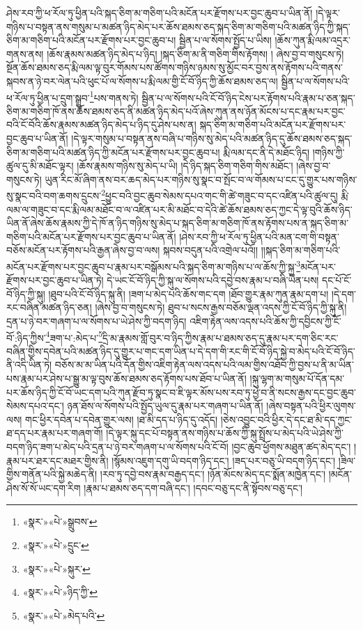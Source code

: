 ཤེས་རབ་ཀྱི་ཕ་རོལ་ཏུ་ཕྱིན་པའི་སྐད་ཅིག་མ་གཅིག་པའི་མངོན་པར་རྫོགས་པར་བྱང་ཆུབ་པ་ཡིན་ནོ། །དེ་ལྟར་གཉིས་པ་བསྟན་ནས་གསུམ་པ་མཚན་ཉིད་མེད་པར་ཆོས་ཐམས་ཅད་སྐད་ཅིག་མ་གཅིག་པའི་མཚན་ཉིད་ཀྱི་སྐད་ཅིག་མ་གཅིག་པའི་མངོན་པར་རྫོགས་པར་བྱང་ཆུབ་པ། སྦྱིན་པ་ལ་སོགས་སྤྱོད་པ་ཡིས། །ཆོས་ཀུན་རྨི་ལམ་འདྲར་གནས་ནས། །ཆོས་རྣམས་མཚན་ཉིད་མེད་པ་ཉིད། །སྐད་ཅིག་མ་ནི་གཅིག་གིས་རྟོགས། །
ཞེས་བྱ་བ་གསུངས་ཏེ། སྔོན་ཆོས་ཐམས་ཅད་རྨི་ལམ་ལྟ་བུར་གོམས་པས་ཚོགས་གཉིས་ཉམས་སུ་མྱོང་བར་བྱས་ནས་རྟོགས་པའི་གནས་སྐབས་ན་ཉེ་བར་ལེན་པའི་ཕུང་པོ་ལ་སོགས་པ་རྨི་ལམ་གྱི་ངོ་བོ་ཉིད་ཀྱི་ཆོས་ཐམས་ཅད་ལ། སྦྱིན་པ་ལ་སོགས་པའི་ཕ་རོལ་ཏུ་ཕྱིན་པ་དྲུག་སྒྲུབ་\footnote{«སྣར་»«པེ་»སྒྲུབས་}པས་གནས་ཏེ། སྦྱིན་པ་ལ་སོགས་པའི་ངོ་བོ་ཉིད་ངེས་པར་རྟོགས་པའི་རྣམ་པ་ཅན་སྐད་ཅིག་མ་གཅིག་ཁོ་ནས་ཆོས་ཐམས་ཅད་ནི་མཚན་ཉིད་མེད་པའོ་ཞེས་ཀུན་ནས་ཉོན་མོངས་པ་དང་རྣམ་པར་བྱང་བའི་ངོ་བོའི་ཆོས་རྣམས་མཚན་ཉིད་མེད་པ་ཉིད་དུ་ཤེས་པས་ན། སྐད་ཅིག་མ་གཅིག་པའི་མངོན་པར་རྫོགས་པར་བྱང་ཆུབ་པ་ཡིན་ནོ། །དེ་ལྟར་གསུམ་པ་བསྟན་ནས་བཞི་པ་གཉིས་སུ་མེད་པའི་མཚན་ཉིད་དུ་ཆོས་ཐམས་ཅད་སྐད་ཅིག་མ་གཅིག་པའི་མཚན་ཉིད་ཀྱི་མངོན་པར་རྫོགས་པར་བྱང་ཆུབ་པ། རྨི་ལམ་དང་ནི་དེ་མཐོང་ཉིད། །གཉིས་ཀྱི་ཚུལ་དུ་མི་མཐོང་ལྟར། །ཆོས་རྣམས་གཉིས་སུ་མེད་པ་ཡི། །དེ་ཉིད་སྐད་ཅིག་གཅིག་གིས་མཐོང་། །ཞེས་བྱ་བ་གསུངས་ཏེ། ཡུན་རིང་མོ་ཞིག་ནས་བར་ཆད་མེད་པར་གཉིས་སུ་སྣང་བ་སྤོང་བ་ལ་གོམས་པ་ངང་དུ་གྱུར་པས་གཉིས་སུ་སྣང་བའི་བག་ཆགས་དྲུངས་\footnote{«སྣར་»«པེ་»དྲུང་}ཕྱུང་བའི་བྱང་ཆུབ་སེམས་དཔའ་གང་གི་ཚེ་གཟུང་བ་དང་འཛིན་པའི་ཚུལ་དུ། རྨི་ལམ་ལ་གཟུང་བ་དང་རྨི་ལམ་མཐོང་བ་ལ་འཛིན་པར་མི་མཐོང་བ་དེའི་ཚེ་ཆོས་ཐམས་ཅད་ཀྱང་དེ་ལྟ་བུའི་ཆོས་ཉིད་ཡིན་ནོ་ཞེས་ཆོས་རྣམས་ཀྱི་དེ་ཁོ་ན་ཉིད་གཉིས་སུ་མེད་པ་སྐད་ཅིག་མ་གཅིག་ཁོ་ནས་རྟོགས་པས་ན་སྐད་ཅིག་མ་གཅིག་པའི་མངོན་པར་རྫོགས་པར་བྱང་ཆུབ་པ་ཡིན་ནོ། །ཤེས་རབ་ཀྱི་ཕ་རོལ་ཏུ་ཕྱིན་པའི་མན་ངག་གི་བསྟན་བཅོས་མངོན་པར་རྟོགས་པའི་རྒྱན་ཞེས་བྱ་བ་ལས། སྐབས་བདུན་པའི་འགྲེལ་པའོ།། །།སྐད་ཅིག་མ་གཅིག་པའི་མངོན་པར་རྫོགས་པར་བྱང་ཆུབ་པ་རྣམ་པར་བསྒོམས་པའི་སྐད་ཅིག་མ་གཉིས་པ་ལ་ཆོས་ཀྱི་སྐུ་\footnote{«སྣར་»«པེ་»སྐུར་}མངོན་པར་རྫོགས་པར་བྱང་ཆུབ་པ་ཡིན་ཏེ། དེ་ཡང་ངོ་བོ་ཉིད་ཀྱི་སྐུ་ལ་སོགས་པའི་དབྱེ་བས་རྣམ་པ་བཞི་ཡིན་པས། དང་པོ་ངོ་བོ་ཉིད་ཀྱི་སྐུ། །ཐུབ་པའི་ངོ་བོ་ཉིད་སྐུ་ནི། །ཟག་པ་མེད་པའི་ཆོས་གང་དག །ཐོབ་གྱུར་རྣམ་ཀུན་རྣམ་དག་པ། །དེ་དག་རང་བཞིན་མཚན་ཉིད་ཅན། །ཞེས་བྱ་བ་གསུངས་ཏེ། ཐུབ་པ་སངས་རྒྱས་བཅོམ་ལྡན་འདས་ཀྱི་ངོ་བོ་ཉིད་ཀྱི་སྐུ་ནི། དྲན་པ་ཉེ་བར་གཞག་པ་ལ་སོགས་པ་ཡེ་ཤེས་ཀྱི་བདག་ཉིད། འཇིག་རྟེན་ལས་འདས་པའི་ཆོས་ཀྱི་དབྱིངས་ཀྱི་ངོ་བོ་:ཉིད་ཀྱིས་\footnote{«སྣར་»«པེ་»ཉིད་ཀྱི་}ཟག་པ་:མེད་པ་\footnote{«སྣར་»«པེ་»མེད་པའི་}དྲི་མ་རྣམས་གློ་བུར་བ་ཉིད་ཀྱིས་རྣམ་པ་ཐམས་ཅད་དུ་རྣམ་པར་དག་ཅིང་རང་བཞིན་གྱིས་དབེན་པའི་མཚན་ཉིད་དུ་གྱུར་པ་གང་དག་ཡིན་པ་དེ་དག་གི་རང་གི་ངོ་བོ་ཉིད་སྐྱེ་བ་མེད་པའི་ངོ་བོ་ཉིད་ནི་འདི་ཡིན་ཏེ། བཅོས་མ་མ་ཡིན་པའི་དོན་གྱིས་འཇིག་རྟེན་ལས་འདས་པའི་ལམ་གྱིས་འཐོབ་ཀྱི་བྱས་པ་ནི་མ་ཡིན་པས་རྣམ་པར་ཤེས་པ་སྒྱུ་མ་ལྟ་བུས་ཆོས་ཐམས་ཅད་རྟོགས་པས་ཐོབ་པ་ཡིན་ནོ། །སྐུ་ལྷག་མ་གསུམ་པོ་དོན་དམ་པར་ཆོས་ཉིད་ཀྱི་ངོ་བོ་ཡང་དག་པའི་ཀུན་རྫོབ་ཏུ་སྣང་བ་ཇི་ལྟར་མོས་པས་རབ་ཏུ་ཕྱེ་བ་ནི་སངས་རྒྱས་དང་བྱང་ཆུབ་སེམས་དཔའ་དང་། ཉན་ཐོས་ལ་སོགས་པའི་སྤྱོད་ཡུལ་དུ་རྣམ་པར་གཞག་པ་ཡིན་ནོ། །ཞེས་བསྟན་པའི་ཕྱིར་ལུགས་ལས། གང་ཕྱིར་དབེན་པ་དབེན་གྱུར་ལས། །ཐ་མི་དད་པ་ཉིད་དུ་འདོད། །ཅེས་འབྱུང་བའི་ཕྱིར་དེ་དང་ཐ་མི་དད་ཀྱང་ཐ་དད་པར་རྣམ་པར་གཞག་གོ། །དེ་ལྟར་སྐུ་དང་པོ་བསྟན་ནས་གཉིས་པ་ཆོས་ཀྱི་སྐུ་སྤྲོས་པ་མེད་པའི་ཡེ་ཤེས་ཀྱི་བདག་ཉིད་ཟག་པ་མེད་པའི་དྲན་པ་ཉེ་བར་གཞག་པ་ལ་སོགས་པའི་ངོ་བོ། །བྱང་ཆུབ་ཕྱོགས་མཐུན་ཚད་མེད་དང་། །རྣམ་པར་ཐར་དང་མཐར་གྱིས་ནི། །སྙོམས་འཇུག་དགུ་ཡི་བདག་ཉིད་དང་། །ཟད་པར་བཅུ་ཡི་བདག་ཉིད་དང་། །ཟིལ་གྱིས་གནོན་པའི་སྐྱེ་མཆེད་ནི། །རབ་ཏུ་དབྱེ་བས་རྣམ་བརྒྱད་དང་། །ཉོན་མོངས་མེད་དང་སྨོན་མཁྱེན་དང་། །མངོན་ཤེས་སོ་སོ་ཡང་དག་རིག །རྣམ་པ་ཐམས་ཅད་དག་བཞི་དང་། །དབང་བཅུ་དང་ནི་སྟོབས་བཅུ་དང་། 